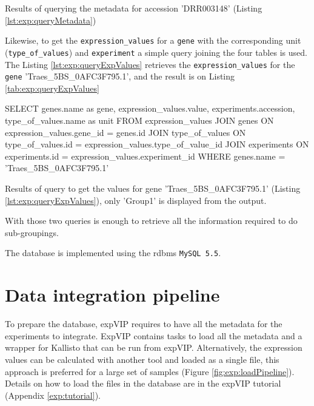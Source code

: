 \begin{table}[h]
\caption[Results of query for metadata]{Results of querying the metadata for accession 'DRR003148' (Listing \ref{lst:exp:queryMetadata})}
\label{tab:exp:queryMetadata}

\end{table}

Likewise, to get the \texttt{expression\_values} for a \texttt{gene} with the corresponding unit (\texttt{type\_of\_values}) and \texttt{experiment} a simple query joining the four tables is used. 
The Listing \ref{lst:exp:queryExpValues} retrieves the \texttt{expression\_values} for the \texttt{gene} 'Traes\_5BS\_0AFC3F795.1', and the result is on Listing \ref{tab:exp:queryExpValues}

\begin{code}[language=sql, caption={[Query values for gene and experiment group] Query values from 'Group1' and gene 'Traes\_5BS\_0AFC3F795.1' },label=lst:exp:queryExpValues]
SELECT 
	genes.name as gene, 
	expression_values.value,
	experiments.accession,
	type_of_values.name as unit
FROM expression_values
JOIN genes 
	ON expression_values.gene_id = genes.id
JOIN type_of_values 
	ON type_of_values.id = expression_values.type_of_value_id
JOIN experiments 
	ON experiments.id = expression_values.experiment_id
WHERE 
	genes.name = 'Traes_5BS_0AFC3F795.1' 
\end{code}

\begin{table}[h]
\caption[Results of query for values]{Results of query to get the values for gene 'Traes\_5BS\_0AFC3F795.1' (Listing \ref{lst:exp:queryExpValues}), only 'Group1' is displayed from the output.}
\label{tab:exp:queryExpValues}

\end{table}

With those two queries is enough to retrieve all the information required to do sub-groupings. 

The database is implemented using the \acrshort{rdbms} \texttt{MySQL 5.5}. 



\section{Data integration pipeline} 
\label{exp:pipeline}


To prepare the database, expVIP requires to have all the metadata for the experiments to integrate. 
ExpVIP contains tasks to load all the metadata and a wrapper for Kallisto that can be run from expVIP. 
Alternatively, the expression values can be calculated with another tool and loaded as a single file, this approach is preferred for a large set of samples (Figure \ref{fig:exp:loadPipeline}). 
Details on how to load the files in the database are in the expVIP tutorial (Appendix \ref{exp:tutorial}). 

